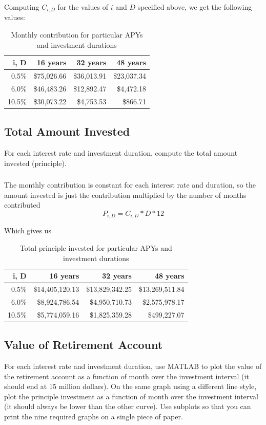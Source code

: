 \documentclass[letterpaper]{report}
\begin{document}
Computing $C_{i,D}$ for the values of $i$ and $D$ specified above, we get the following values:
\begin{table}[h]
	\centering
	\begin{tabular}{|r|r|r|r|}
		\hline 
		i, D & 16 years & 32 years & 48 years \\ 
		\hline 
		0.5\% & \$75,026.66 & \$36,013.91 & \$23,037.34 \\ 
		\hline 
		6.0\% & \$46,483.26 & \$12,892.47 & \$4,472.18 \\ 
		\hline 
		10.5\% & \$30,073.22 & \$4,753.53 & \$866.71 \\ 
		\hline 
	\end{tabular} 
	\caption[Table 1:]{Monthly contribution for particular APYs and investment durations}
\end{table}

\pagebreak
\subsection{Total Amount Invested}
For each interest rate and investment duration, compute the total amount invested (principle).

\subsubsection{}
The monthly contribution is constant for each interest rate and duration, so the amount invested is just the contribution multiplied by the number of months contributed
\[
	P_{i,D} = C_{i,D} * D * 12
\]

Which gives us
\begin{table}[h]
	\centering
	\begin{tabular}{|r|r|r|r|}
		\hline 
		i, D & 16 years & 32 years & 48 years \\ 
		\hline 
		0.5\% & \$14,405,120.13 & \$13,829,342.25 & \$13,269,511.84 \\ 
		\hline 
		6.0\% & \$8,924,786.54 & \$4,950,710.73 & \$2,575,978.17 \\ 
		\hline 
		10.5\% & \$5,774,059.16 & \$1,825,359.28 & \$499,227.07 \\ 
		\hline 
	\end{tabular} 
	\caption[Table 2:]{Total principle invested for particular APYs and investment durations}
\end{table}

\pagebreak
\subsection{Value of Retirement Account}
For each interest rate and investment duration, use MATLAB to plot the value of the retirement account as a function of month over the investment interval (it should end at 15 million dollars). On the same graph using a different line style, plot the principle investment as a function of month over the investment interval (it should always be lower than the other curve). Use subplots so that you can print the nine required graphs on a single piece of paper.
\end{document}
